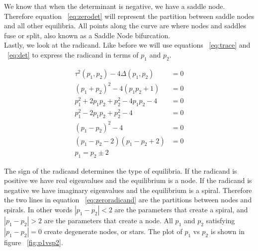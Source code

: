 \documentclass{article}
\begin{document}
\noindent We know that when the determinant is negative, we have a saddle
node. Therefore equation ~\ref{eq:zerodet} will represent the partition between
saddle nodes and all other equilibria. All points along the curve are where
nodes and saddles fuse or split, also known as a Saddle Node bifurcation. \\


\noindent Lastly, we look at the radicand. Like before we will use equations
~\ref{eq:trace} and ~\ref{eq:det} to express the radicand in terms of $p_1$ and
$p_2$.

\begin{align}
    \tau^2(p_1,p_2) - 4\Delta(p_1,p_2) &=0 \nonumber \\
    (p_1+p_2)^2-4(p_1p_2+1) &=0 \nonumber \\
    p_1^2+2p_1p_2+p_2^2-4p_1p_2-4 &=0 \nonumber \\
    p_1^2-2p_1p_2+p_2^2-4 &=0 \nonumber \\
    (p_1-p_2)^2-4 &=0 \nonumber \\
    (p_1-p_2-2)(p_1-p_2+2) &=0 \nonumber \\
    p_1 = p_2 \pm 2 \label{eq:zeroradicand}
\end{align}

\noindent The sign of the radicand determines the type of equilibria. If the
radicand is positive we have real eigenvalues and the equilibrium is a node. If
the radicand is negative we have imaginary eigenvalues and the equilibrium is a
spiral. Therefore the two lines in equation ~\ref{eq:zeroradicand} are the
partitions between nodes and spirals. In other words $|p_1-p_2| < 2$ are
the parameters that create a spiral, and $|p_1-p_2| > 2$ are the parameters that
create a node. All $p_1$ and $p_2$ satisfying $|p_1-p_2|=0$ create degenerate
nodes, or stars. The plot of $p_1$ vs $p_2$ is shown in figure ~\ref{fig:p1vsp2}.\\
\end{document}
